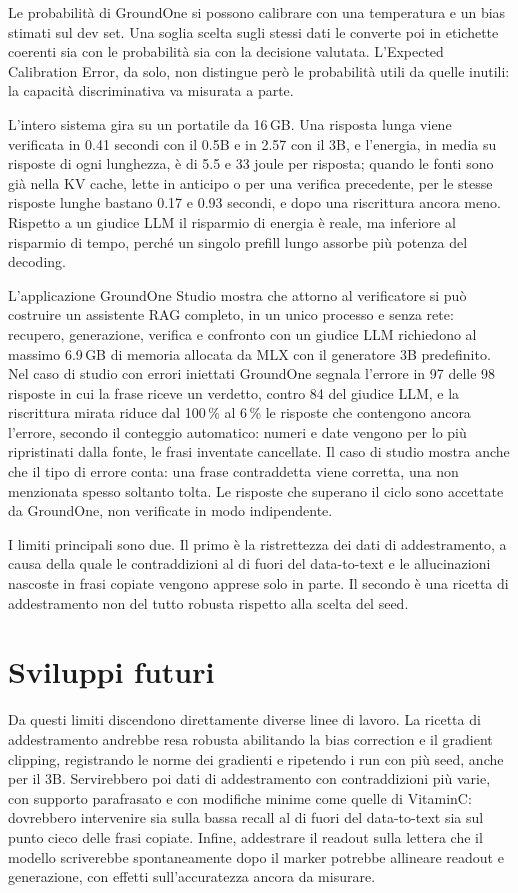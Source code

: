 Le probabilità di GroundOne si possono calibrare con una temperatura e un bias stimati sul dev set. Una soglia scelta
sugli stessi dati le converte poi in etichette coerenti sia con le probabilità sia con la decisione valutata.
L'Expected Calibration Error, da solo, non distingue però le probabilità utili da quelle inutili: la capacità
discriminativa va misurata a parte.

L'intero sistema gira su un portatile da 16\,GB. Una risposta lunga viene verificata in 0.41 secondi con il 0.5B e in 2.57 con il 3B, e l'energia, in media su risposte di ogni lunghezza, è di 5.5 e 33 joule per risposta; quando le fonti sono già nella KV cache, lette in anticipo o per una verifica precedente, per le stesse risposte lunghe bastano 0.17 e 0.93 secondi, e dopo una riscrittura ancora meno. Rispetto a un giudice LLM il risparmio di energia è reale, ma
inferiore al risparmio di tempo, perché un singolo prefill lungo assorbe più potenza del decoding.

L'applicazione GroundOne Studio mostra che attorno al verificatore si può costruire un assistente RAG completo, in un
unico processo e senza rete: recupero, generazione, verifica e confronto con un giudice LLM richiedono al massimo 6.9\,GB di memoria allocata da MLX con il generatore 3B predefinito. Nel caso di studio con errori iniettati GroundOne segnala l'errore in 97 delle 98 risposte in cui la frase riceve un verdetto, contro 84 del giudice LLM, e la riscrittura mirata riduce dal 100\,\% al 6\,\% le risposte che contengono ancora l'errore, secondo il conteggio automatico: numeri e date vengono per lo più ripristinati dalla fonte, le frasi inventate cancellate. Il caso di studio mostra anche che il tipo di errore conta: una frase contraddetta viene corretta, una non menzionata spesso soltanto tolta. Le risposte che superano il ciclo sono accettate da GroundOne, non verificate in modo indipendente.

I limiti principali sono due. Il primo è la ristrettezza dei dati di addestramento, a causa della quale le
contraddizioni al di fuori del data-to-text e le allucinazioni nascoste in frasi copiate vengono apprese solo in parte.
Il secondo è una ricetta di addestramento non del tutto robusta rispetto alla scelta del seed.

\section{Sviluppi futuri}
\label{sec:concl-future}

Da questi limiti discendono direttamente diverse linee di lavoro. La ricetta di addestramento andrebbe resa robusta
abilitando la bias correction e il gradient clipping, registrando le norme dei gradienti e ripetendo i run con più seed,
anche per il 3B. Servirebbero poi dati di addestramento con contraddizioni più varie, con supporto parafrasato e con
modifiche minime come quelle di VitaminC: dovrebbero intervenire sia sulla bassa recall al di fuori del data-to-text sia
sul punto cieco delle frasi copiate. Infine, addestrare il readout sulla lettera che il modello scriverebbe
spontaneamente dopo il marker potrebbe allineare readout e generazione, con effetti sull'accuratezza ancora da misurare.

